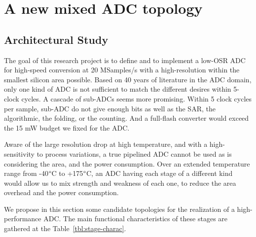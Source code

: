\chapter{A new mixed ADC topology}
\label{sec:adc-implementation}

\ifpdf 
    \graphicspath{{Chapter4/Figs/Raster/}{Chapter4/Figs/PDF/}{Chapter4/Figs/}}
\else
    \graphicspath{{Chapter4/Figs/Vector/}{Chapter4/Figs/}}
\fi

\section{Architectural Study}
The goal of this research project is to define and to implement a low-OSR ADC for high-speed conversion at 20 MSamples/s with a high-resolution within the smallest silicon area possible. Based on 40 years of literature in the ADC domain, only one kind of ADC is not sufficient to match the different desires within 5-clock cycles. A cascade of sub-ADCs seems more promising. Within 5 clock cycles per sample, sub-ADC do not give enough bits as well as the SAR, the algorithmic, the folding, or the counting. And a full-flash converter would exceed the 15 mW budget we fixed for the ADC\@.

Aware of the large resolution drop at high temperature, and with a high-sensitivity to process variations, a true pipelined ADC cannot be used as is considering the area, and the power consumption. Over an extended temperature range from -40\(\degree \)C to +175\(\degree \)C, an ADC having each stage of a different kind would allow us to mix strength and weakness of each one, to reduce the area overhead and the power consumption.

We propose in this section some candidate topologies for the realization of a high-performance ADC\@. The main functional characteristics of these stages are gathered at the Table~\ref{tbl:stage-charac}.

